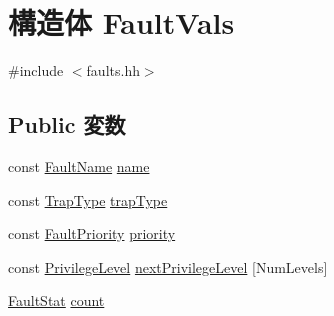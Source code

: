 \hypertarget{structSparcISA_1_1SparcFaultBase_1_1FaultVals}{
\section{構造体 FaultVals}
\label{structSparcISA_1_1SparcFaultBase_1_1FaultVals}
}


{\ttfamily \#include $<$faults.hh$>$}\subsection*{Public 変数}
\begin{DoxyCompactItemize}
\item 
const \hyperlink{sim_2faults_8hh_abb196df64725e5c2568c900cf130d8d7}{FaultName} \hyperlink{structSparcISA_1_1SparcFaultBase_1_1FaultVals_a4d488474632193509a5a7521b4cf58f4}{name}
\item 
const \hyperlink{namespaceSparcISA_aabeb6cc11127ef5b6ebc776bfc5fb95b}{TrapType} \hyperlink{structSparcISA_1_1SparcFaultBase_1_1FaultVals_a41763b5be7c79a428f4b7f3454f1aaf7}{trapType}
\item 
const \hyperlink{namespaceSparcISA_ab4ef46911de05ddf45ea58ee440ff324}{FaultPriority} \hyperlink{structSparcISA_1_1SparcFaultBase_1_1FaultVals_a044754835a382d72a8d4b4c7dd2bade2}{priority}
\item 
const \hyperlink{classSparcISA_1_1SparcFaultBase_a4cf6b4de13e22b76c2be9d329d8a9b1a}{PrivilegeLevel} \hyperlink{structSparcISA_1_1SparcFaultBase_1_1FaultVals_a00339c2f17b3e6475516621e3497bbd2}{nextPrivilegeLevel} \mbox{[}NumLevels\mbox{]}
\item 
\hyperlink{classStats_1_1Scalar}{FaultStat} \hyperlink{structSparcISA_1_1SparcFaultBase_1_1FaultVals_a1b98f9d520cb54d9b9322e9c45fed459}{count}
\end{DoxyCompactItemize}


